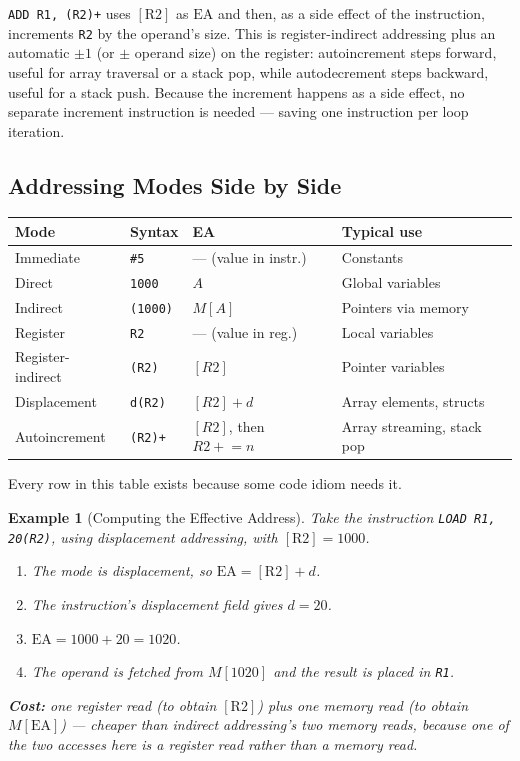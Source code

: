 \documentclass[11pt]{article}
\newtheorem{example}{Example}[section]
\begin{document}
\texttt{ADD R1, (R2)+} uses $[\text{R2}]$ as $\text{EA}$ and then, as a side effect of the instruction, increments \texttt{R2} by the operand's size. This is register-indirect addressing plus an automatic $\pm 1$ (or $\pm$ operand size) on the register: autoincrement steps forward, useful for array traversal or a stack pop, while autodecrement steps backward, useful for a stack push. Because the increment happens as a side effect, no separate increment instruction is needed --- saving one instruction per loop iteration.

\subsection{Addressing Modes Side by Side}

\begin{center}
\small
\begin{tabular}{@{}p{2.6cm}p{2.6cm}p{2.6cm}p{4.2cm}@{}}
\toprule
\textbf{Mode} & \textbf{Syntax} & \textbf{EA} & \textbf{Typical use} \\
\midrule
Immediate & \texttt{\#5} & --- (value in instr.) & Constants \\
Direct & \texttt{1000} & $A$ & Global variables \\
Indirect & \texttt{(1000)} & $M[A]$ & Pointers via memory \\
Register & \texttt{R2} & --- (value in reg.) & Local variables \\
Register-indirect & \texttt{(R2)} & $[R2]$ & Pointer variables \\
Displacement & \texttt{d(R2)} & $[R2] + d$ & Array elements, structs \\
Autoincrement & \texttt{(R2)+} & $[R2]$, then $R2 \mathrel{+}= n$ & Array streaming, stack pop \\
\bottomrule
\end{tabular}
\end{center}

Every row in this table exists because some code idiom needs it.

\begin{example}[Computing the Effective Address]
Take the instruction \texttt{LOAD R1, 20(R2)}, using displacement addressing, with $[\text{R2}] = 1000$.
\begin{enumerate}
  \item The mode is displacement, so $\text{EA} = [\text{R2}] + d$.
  \item The instruction's displacement field gives $d = 20$.
  \item $\text{EA} = 1000 + 20 = 1020$.
  \item The operand is fetched from $M[1020]$ and the result is placed in \texttt{R1}.
\end{enumerate}
\textbf{Cost:} one register read (to obtain $[\text{R2}]$) plus one memory read (to obtain $M[\text{EA}]$) --- cheaper than indirect addressing's two \emph{memory} reads, because one of the two accesses here is a register read rather than a memory read.
\end{example}
\end{document}
